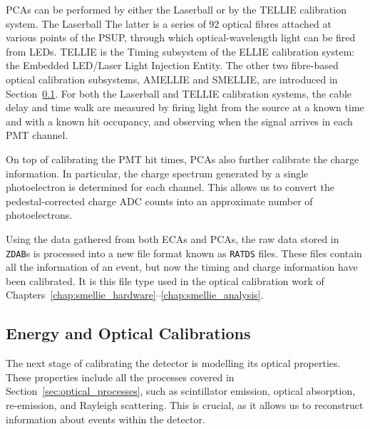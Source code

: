 PCAs can be performed by either the Laserball or by the TELLIE calibration system. The Laserball
The latter is a series of 92 optical fibres attached at various points of the PSUP, through which optical-wavelength light can be fired from LEDs. TELLIE is the Timing subsystem of the ELLIE calibration system: the Embedded LED/Laser Light Injection Entity. The other two fibre-based optical calibration subsystems, AMELLIE and SMELLIE, are introduced in Section~\ref{sec:eo_calibs}. For both the Laserball and TELLIE calibration systems, the cable delay and time walk are measured by firing light from the source at a known time and with a known hit occupancy, and observing when the signal arrives in each PMT channel.

On top of calibrating the PMT hit times, PCAs also further calibrate the charge information. In particular, the charge spectrum generated by a single photoelectron is determined for each channel. This allows us to convert the pedestal-corrected charge ADC counts into an approximate number of photoelectrons.

Using the data gathered from both ECAs and PCAs, the raw data stored in \texttt{ZDAB}s is processed into a new file format known as \texttt{RATDS} files. These files contain all the information of an event, but now the timing and charge information have been calibrated. It is this file type used in the optical calibration work of Chapters~\ref{chap:smellie_hardware}--\ref{chap:smellie_analysis}.

\subsection{Energy and Optical Calibrations}\label{sec:eo_calibs}
The next stage of calibrating the detector is modelling its optical properties. These properties include all the processes covered in Section~\ref{sec:optical_processes}, such as scintillator emission, optical absorption, re-emission, and Rayleigh scattering.
This is crucial, as it allows us to reconstruct information about events within the detector.

